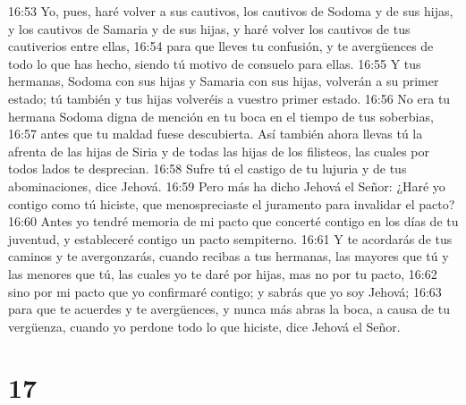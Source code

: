 16:53 Yo, pues, haré volver a sus cautivos, los cautivos de Sodoma y de sus hijas, y los cautivos de Samaria y de sus hijas, y haré volver los cautivos de tus cautiverios entre ellas,  
16:54 para que lleves tu confusión, y te avergüences de todo lo que has hecho, siendo tú motivo de consuelo para ellas.  
16:55 Y tus hermanas, Sodoma con sus hijas y Samaria con sus hijas, volverán a su primer estado; tú también y tus hijas volveréis a vuestro primer estado.  
16:56 No era tu hermana Sodoma digna de mención en tu boca en el tiempo de tus soberbias,  
16:57 antes que tu maldad fuese descubierta. Así también ahora llevas tú la afrenta de las hijas de Siria y de todas las hijas de los filisteos, las cuales por todos lados te desprecian.  
16:58 Sufre tú el castigo de tu lujuria y de tus abominaciones, dice Jehová.  
16:59 Pero más ha dicho Jehová el Señor: ¿Haré yo contigo como tú hiciste, que menospreciaste el juramento para invalidar el pacto?  
16:60 Antes yo tendré memoria de mi pacto que concerté contigo en los días de tu juventud, y estableceré contigo un pacto sempiterno.  
16:61 Y te acordarás de tus caminos y te avergonzarás, cuando recibas a tus hermanas, las mayores que tú y las menores que tú, las cuales yo te daré por hijas, mas no por tu pacto,  
16:62 sino por mi pacto que yo confirmaré contigo; y sabrás que yo soy Jehová;  
16:63 para que te acuerdes y te avergüences, y nunca más abras la boca, a causa de tu vergüenza, cuando yo perdone todo lo que hiciste, dice Jehová el Señor.  

\chapter{17}

